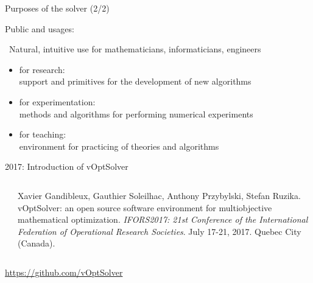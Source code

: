 \documentclass[]{beamer}
\newcommand*{\blue}[1]{\textcolor{nblue}{#1}}
\begin{document}
% 
%
\begin{frame}{Purposes of {the solver} (2/2)}

Public and usages:\vspace{3mm}

\ \blue{Natural}, \blue{intuitive} use for  mathematicians, informaticians, engineers
 \vspace{2mm}

\begin{itemize}
    
    \item \blue{for research:} \vspace{-1mm} \\ support and primitives for the development of new algorithms    \vspace{0mm} %
    \item \blue{for experimentation:} \vspace{-1mm}\\ methods and algorithms for performing numerical experiments    \vspace{0mm} %
    \item \blue{for teaching:} \vspace{-1mm}\\ environment for practicing of theories and algorithms
\end{itemize}
\vspace{5mm}
\pause


    2017: Introduction of \blue{vOptSolver}  \vspace{1.25mm}\\
    \begin{columns}
      \begin{column}{0.05\textwidth}
      \end{column}
      \begin{column}{0.85\textwidth}
              {\tiny
Xavier Gandibleux, Gauthier Soleilhac, Anthony Przybylski, Stefan Ruzika. vOptSolver: an open source software environment for multiobjective mathematical optimization. \textit{IFORS2017: 21st Conference of the International Federation of Operational Research Societies}. July 17-21, 2017. Quebec City (Canada).%


\vspace{2mm}}
      \end{column}
      \end{columns}
\hspace{10mm}\url{https://github.com/vOptSolver}


\end{frame}
\end{document}
